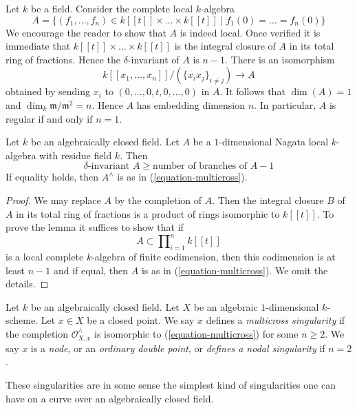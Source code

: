 \medskip\noindent
Let $k$ be a field. Consider the complete local $k$-algebra
\begin{equation}
\label{equation-multicross}
A = \{(f_1, \ldots, f_n) \in k[[t]] \times \ldots \times k[[t]] \mid
f_1(0) = \ldots = f_n(0)\}
\end{equation}
We encourage the reader to show that $A$ is indeed local.
Once verified it is immediate that $k[[t]] \times \ldots \times k[[t]]$
is the integral closure of $A$ in its total ring of fractions.
Hence the $\delta$-invariant of $A$ is $n - 1$.
There is an isomorphism
$$
k[[x_1, \ldots, x_n]]/(\{x_ix_j\}_{i \not = j}) \longrightarrow A
$$
obtained by sending $x_i$ to $(0, \ldots, 0, t, 0, \ldots, 0)$
in $A$. It follows that $\dim(A) = 1$ and
$\dim_k \mathfrak m/\mathfrak m^2 = n$.
Hence $A$ has embedding dimension $n$.
In particular, $A$ is regular if and only if $n = 1$.

\begin{lemma}
\label{lemma-multicross-algebra}
Let $k$ be an algebraically closed field. Let $A$ be a
$1$-dimensional Nagata local $k$-algebra with residue field $k$.
Then
$$
\delta\text{-invariant }A \geq \text{number of branches of }A - 1
$$
If equality holds, then $A^\wedge$ is as in (\ref{equation-multicross}).
\end{lemma}

\begin{proof}
We may replace $A$ by the completion of $A$. Then the integral closure
$B$ of $A$ in its total ring of fractions is a product of rings
isomorphic to $k[[t]]$. To prove the lemma it suffices to show
that if
$$
A \subset \prod\nolimits_{i = 1}^n k[[t]]
$$
is a local complete $k$-algebra of finite codimension, then
this codimension is at least $n - 1$ and if equal, then $A$
is as in (\ref{equation-multicross}). We omit the details.
\end{proof}

\begin{definition}
\label{definition-multicross}
Let $k$ be an algebraically closed field. Let $X$ be an algebraic
$1$-dimensional $k$-scheme. Let $x \in X$ be a closed point.
We say $x$ defines a {\it multicross singularity} if the completion
$\mathcal{O}_{X, x}^\wedge$
is isomorphic to (\ref{equation-multicross}) for some $n \geq 2$.
We say $x$ is a {\it node}, or an {\it ordinary double point}, or
{\it defines a nodal singularity} if $n = 2$.
\end{definition}

\noindent
These singularities are in some sense the simplest kind of singularities
one can have on a curve over an algebraically closed field.

